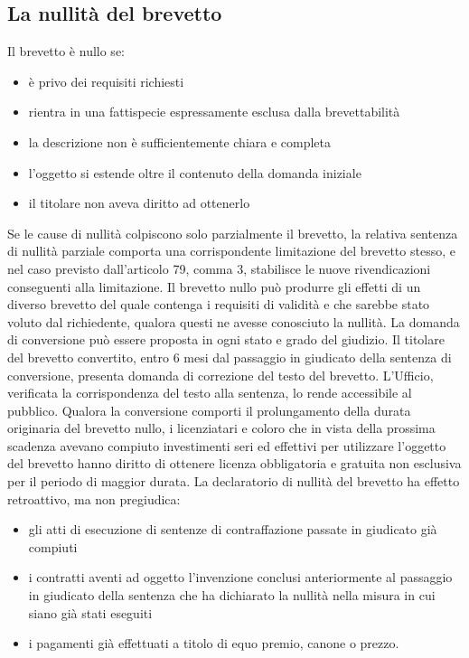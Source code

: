 \subsection{La nullità del brevetto}
Il brevetto è nullo se:
\begin{itemize}
    \item è privo dei requisiti richiesti
    \item rientra in una fattispecie espressamente esclusa dalla brevettabilità
    \item la descrizione non è sufficientemente chiara e completa
    \item l'oggetto si estende oltre il contenuto della domanda iniziale
    \item il titolare non aveva diritto ad ottenerlo
\end{itemize}
Se le cause di nullità colpiscono solo parzialmente il brevetto, la relativa sentenza di nullità parziale comporta una corrispondente
limitazione del brevetto stesso, e nel caso previsto dall'articolo 79, comma 3, stabilisce le nuove rivendicazioni conseguenti alla limitazione.\newline
Il brevetto nullo può produrre gli effetti di un diverso brevetto del quale contenga i requisiti di validità e che sarebbe stato voluto dal
richiedente, qualora questi ne avesse conosciuto la nullità. La domanda di conversione può essere proposta in ogni stato e grado del giudizio.\newline
Il titolare del brevetto convertito, entro 6 mesi dal passaggio in giudicato della sentenza di conversione, presenta domanda di correzione del testo del brevetto.
L'Ufficio, verificata la corrispondenza del testo alla sentenza, lo rende accessibile al pubblico.\newline
Qualora la conversione comporti il prolungamento della durata originaria del brevetto nullo, i licenziatari e
coloro che in vista della prossima scadenza avevano compiuto investimenti seri ed effettivi per utilizzare l'oggetto del brevetto hanno diritto di ottenere licenza obbligatoria
e gratuita non esclusiva per il periodo di maggior durata.\newline
La declaratorio di nullità del brevetto ha effetto retroattivo, ma non pregiudica:
\begin{itemize}
    \item gli atti di esecuzione di sentenze di contraffazione passate in giudicato già compiuti
    \item i contratti aventi ad oggetto l'invenzione conclusi anteriormente al passaggio in giudicato della sentenza
    che ha dichiarato la nullità nella misura in cui siano già stati eseguiti
    \item i pagamenti già effettuati a titolo di equo premio, canone o prezzo.
\end{itemize}
